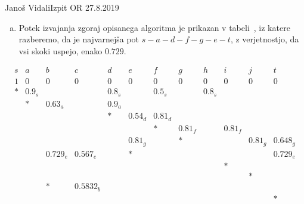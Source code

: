 \begin{naloga}{Janoš Vidali}{Izpit OR 27.8.2019}
\begin{odgovor}
\begin{enumerate}[(a)]
\item Potek izvajanja zgoraj opisanega algoritma je prikazan v tabeli~\tab,
iz katere razberemo,
da je najvarnejša pot $s - a - d - f - g - e - t$,
z verjetnostjo, da vsi skoki uspejo, enako $0.729$.
\end{enumerate}
%
\begin{tabela}
$$
\begin{array}{cccccccccccc}
s & a & b & c & d & e & f & g & h & i & j & t \\ \hline
1 & 0 & 0 & 0 & 0 & 0 & 0 & 0 & 0 & 0 & 0 & 0 \\
* & 0.9_s &&& 0.8_s && 0.5_s && 0.8_s &&& \\
& * & 0.63_a && 0.9_a &&&&&&& \\
&&&& * & 0.54_d & 0.81_d &&&&& \\
&&&&&& * & 0.81_f && 0.81_f && \\
&&&&& 0.81_g && * &&& 0.81_g & 0.648_g \\
&& 0.729_e & 0.567_e && * &&&&&& 0.729_e \\
&&&&&&&&& * && \\
&&&&&&&&&& * & \\
&& * & 0.5832_b &&&&&&&& \\
&&&&&&&&&&& * \\
\end{array}
$$
\end{tabela}
\end{odgovor}
\end{naloga}
